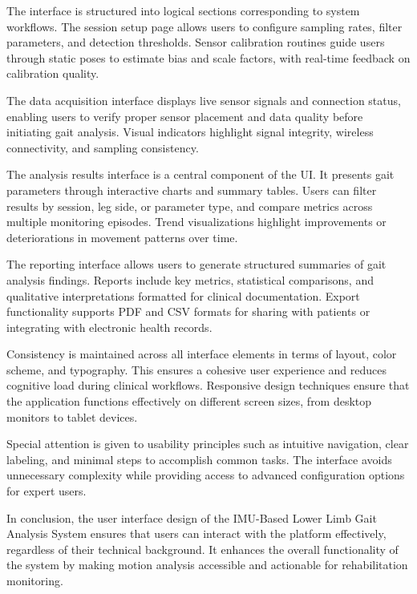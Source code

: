 \documentclass[12pt,a4paper]{report}
\begin{document}
The interface is structured into logical sections corresponding to system workflows. The session setup page allows users to configure sampling rates, filter parameters, and detection thresholds. Sensor calibration routines guide users through static poses to estimate bias and scale factors, with real-time feedback on calibration quality.

The data acquisition interface displays live sensor signals and connection status, enabling users to verify proper sensor placement and data quality before initiating gait analysis. Visual indicators highlight signal integrity, wireless connectivity, and sampling consistency.

The analysis results interface is a central component of the UI. It presents gait parameters through interactive charts and summary tables. Users can filter results by session, leg side, or parameter type, and compare metrics across multiple monitoring episodes. Trend visualizations highlight improvements or deteriorations in movement patterns over time.

The reporting interface allows users to generate structured summaries of gait analysis findings. Reports include key metrics, statistical comparisons, and qualitative interpretations formatted for clinical documentation. Export functionality supports PDF and CSV formats for sharing with patients or integrating with electronic health records.

Consistency is maintained across all interface elements in terms of layout, color scheme, and typography. This ensures a cohesive user experience and reduces cognitive load during clinical workflows. Responsive design techniques ensure that the application functions effectively on different screen sizes, from desktop monitors to tablet devices.

Special attention is given to usability principles such as intuitive navigation, clear labeling, and minimal steps to accomplish common tasks. The interface avoids unnecessary complexity while providing access to advanced configuration options for expert users.

In conclusion, the user interface design of the IMU-Based Lower Limb Gait Analysis System ensures that users can interact with the platform effectively, regardless of their technical background. It enhances the overall functionality of the system by making motion analysis accessible and actionable for rehabilitation monitoring.


\setcounter{chapter}{5}
\clearpage
\thispagestyle{empty}
\end{document}

